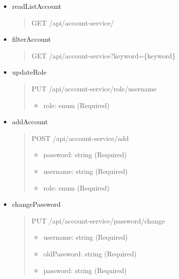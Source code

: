 \begin{itemize}
	\item readListAccount
	      \begin{quote}
		      GET /api/account-service/
	      \end{quote}

	\item filterAccount
	      \begin{quote}
		      GET /api/account-service?keyword=\{keyword\}
	      \end{quote}

	\item updateRole
	      \begin{quote}
		      PUT /api/account-service/role/{username}
		      \begin{itemize}
			      \item role: enum (Required)
		      \end{itemize}
	      \end{quote}

	\item addAccount
	      \begin{quote}
		      POST /api/account-service/add
		      \begin{itemize}
			      \item password: string (Required)
			      \item username: string (Required)
			      \item role: enum (Required)
		      \end{itemize}
	      \end{quote}
	\item changePassword
	      \begin{quote}
		      PUT /api/account-service/password/change
		      \begin{itemize}
			      \item username: string (Required)
			      \item oldPassword: string (Required)
			      \item password: string (Required)
		      \end{itemize}
	      \end{quote}
\end{itemize}

